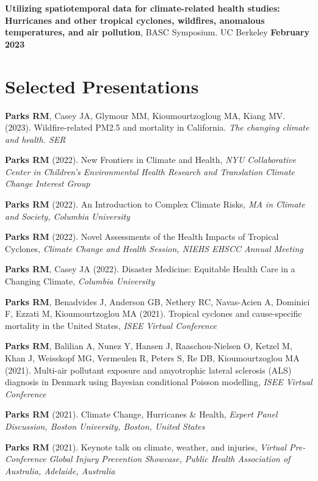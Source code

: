 \noindent \textbf{Utilizing spatiotemporal data for climate-related health studies: Hurricanes and other tropical cyclones, wildfires, anomalous temperatures, and air pollution}, BASC Symposium. UC Berkeley \hfill \textbf{February 2023}

\section*{Selected Presentations}

\noindent \textbf{Parks RM}, Casey JA, Glymour MM, Kioumourtzogloug MA, Kiang MV. (2023). Wildfire-related PM2.5 and mortality in California. \textit{The changing climate and health. SER} \medskip

\noindent \textbf{Parks RM} (2022). New Frontiers in Climate and Health, \textit{NYU Collaborative Center in Children's Environmental Health Research and Translation Climate Change Interest Group
} \medskip

\noindent \textbf{Parks RM} (2022). An Introduction to Complex Climate Risks, \textit{MA in Climate and Society, Columbia University} \medskip

\noindent \textbf{Parks RM} (2022). Novel Assessments of the Health Impacts of Tropical Cyclones, \textit{Climate Change and Health Session, NIEHS EHSCC Annual Meeting} \medskip

\noindent \textbf{Parks RM}, Casey JA (2022). Disaster Medicine: Equitable Health Care in a Changing Climate, \textit{Columbia University} \medskip

\noindent \textbf{Parks RM}, Benadvides J, Anderson GB, Nethery RC, Navas-Acien A, Dominici F, Ezzati M, Kioumourtzoglou MA (2021). Tropical cyclones and cause-specific mortality in the United States, \textit{ISEE Virtual Conference} \medskip

\noindent \textbf{Parks RM}, Balilian A, Nunez Y, Hansen J, Raaschou-Nielsen O, Ketzel M, Khan J, Weisskopf MG, Vermeulen R, Peters S, Re DB, Kioumourtzoglou MA (2021). Multi-air pollutant exposure and amyotrophic lateral sclerosis (ALS) diagnosis in Denmark using Bayesian conditional Poisson modelling, \textit{ISEE Virtual Conference} \medskip

\noindent \textbf{Parks RM} (2021). Climate Change, Hurricanes \& Health,  \textit{Expert Panel Discussion, Boston University, Boston, United States} \medskip

\noindent \textbf{Parks RM} (2021). Keynote talk on climate, weather, and injuries,  \textit{Virtual Pre-Conference Global Injury Prevention Showcase, Public Health Association of Australia, Adelaide, Australia} \medskip


